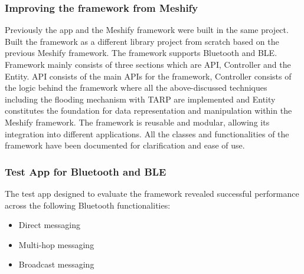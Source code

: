 \subsubsection{Improving the framework from Meshify}

Previously the app and the Meshify framework were built in the same project.
Built the framework as a different library project from scratch based on the
previous Meshify framework. The framework supports Bluetooth and BLE.
Framework mainly consists of three sections which are API, Controller and the
Entity. API consists of the main APIs for the framework, Controller consists of
the logic behind the framework where all the above-discussed techniques
including the flooding mechanism with TARP are implemented and Entity
constitutes the foundation for data representation and manipulation within the
Meshify framework. The framework is reusable and modular, allowing its
integration into different applications. All the classes and functionalities of
the framework have been documented for clarification and ease of use.

\vspace{0.3cm}

\subsubsection{Test App for Bluetooth and BLE}

The test app designed to evaluate the framework revealed successful performance
across the following Bluetooth functionalities:

\begin{itemize}
    \item Direct messaging
    \item Multi-hop messaging
    \item Broadcast messaging
\end{itemize}

